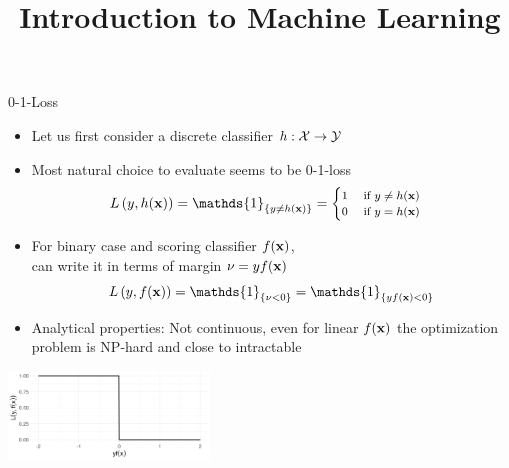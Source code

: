 \documentclass[11pt,compress,t,notes=noshow, xcolor=table]{beamer}
\title{Introduction to Machine Learning}
\begin{document}
    

\begin{vbframe}{0-1-Loss}

\begin{itemize}
  \item Let us first consider a discrete classifier $h: \mathcal{X} \to \mathcal{Y}$
  \item Most natural choice to evaluate seems to be 0-1-loss 
    $$
  \Lhxy = \mathds{1}_{\{y \ne \hx\}} =
     \footnotesize \begin{cases} 1 \quad \text{ if } y \ne \hx \\ 0 \quad    \text{ if } y = \hx  \end{cases}
  $$
  \item For binary case and scoring classifier $f(\mathbf{x})$, \\
  can write it in terms of margin $\nu = yf(\mathbf{x})$
  $$
  \Lxy = \mathds{1}_{\{\nu < 0\}} = \mathds{1}_{\{y\fx < 0\}}
  $$
  \item Analytical properties:  Not continuous, even for linear $f(\mathbf{x})$ the optimization problem is NP-hard and close to intractable 
\end{itemize}

\begin{center}
\includegraphics[width = 0.4\textwidth]{figure/zero_one.png}
\end{center}

\end{vbframe}
\end{document}

